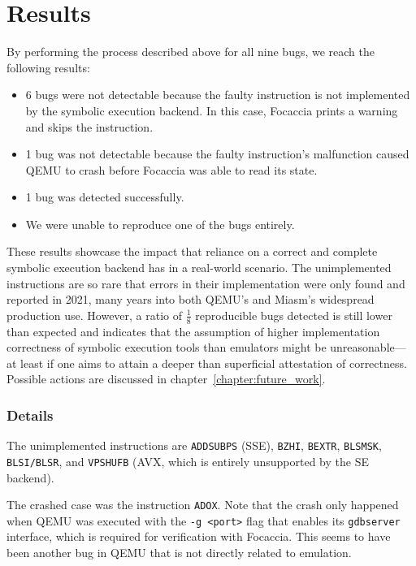 \section{Results}

By performing the process described above for all nine bugs, we reach the following results:

\begin{itemize}
    \item 6 bugs were not detectable because the faulty instruction is not implemented by the symbolic execution
        backend. In this case, Focaccia prints a warning and skips the instruction.
    \item 1 bug was not detectable because the faulty instruction's malfunction caused QEMU to crash before Focaccia was
        able to read its state.
    \item 1 bug was detected successfully.
    \item We were unable to reproduce one of the bugs entirely.
\end{itemize}

These results showcase the impact that reliance on a correct and complete symbolic execution backend has in a real-world
scenario. The unimplemented instructions are so rare that errors in their implementation were only found and reported in
2021, many years into both QEMU's and Miasm's widespread production use. However, a ratio of $\frac{1}{8}$ reproducible
bugs detected is still lower than expected and indicates that the assumption of higher implementation correctness of
symbolic execution tools than emulators might be unreasonable---at least if one aims to attain a deeper than superficial
attestation of correctness. Possible actions are discussed in chapter~\ref{chapter:future_work}.

\subsubsection{Details}

The unimplemented instructions are \texttt{ADDSUBPS} (SSE), \texttt{BZHI}, \texttt{BEXTR}, \texttt{BLSMSK},
\texttt{BLSI/BLSR}, and \texttt{VPSHUFB} (AVX, which is entirely unsupported by the SE backend).

The crashed case was the instruction \texttt{ADOX}. Note that the crash only happened when QEMU was executed with the
\texttt{-g <port>} flag that enables its \texttt{gdbserver} interface, which is required for verification with Focaccia.
This seems to have been another bug in QEMU that is not directly related to emulation.

